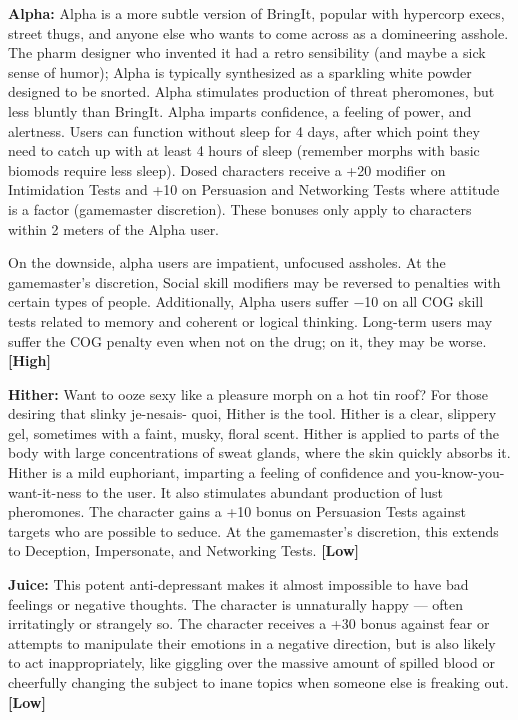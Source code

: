 \textbf{Alpha:} Alpha is a more subtle version of BringIt, popular with hypercorp execs, street thugs, and anyone else who wants to come across as a domineering asshole. The pharm designer who invented it had a retro sensibility (and maybe a sick sense of humor); Alpha is typically synthesized as a sparkling white powder designed to be snorted. Alpha stimulates production of threat pheromones, but less bluntly than BringIt. Alpha imparts confidence, a feeling of power, and alertness. Users can function without sleep for 4 days, after which point they need to catch up with at least 4 hours of sleep (remember morphs with basic biomods require less sleep). Dosed characters receive a +20 modifier on Intimidation Tests and +10 on Persuasion and Networking Tests where attitude is a factor (gamemaster discretion). These bonuses only apply to characters within 2 meters of the Alpha user. 

On the downside, alpha users are impatient, unfocused assholes. At the gamemaster’s discretion, Social skill modifiers may be reversed to penalties with certain types of people. Additionally, Alpha users suffer $-$10 on all COG skill tests related to memory and coherent or logical thinking. Long-term users may suffer the COG penalty even when not on the drug; on it, they may be worse. \textbf{[High]} 

\textbf{Hither:} Want to ooze sexy like a pleasure morph on a hot tin roof? For those desiring that slinky je-nesais- quoi, Hither is the tool. Hither is a clear, slippery gel, sometimes with a faint, musky, floral scent. Hither is applied to parts of the body with large concentrations of sweat glands, where the skin quickly absorbs it. Hither is a mild euphoriant, imparting a feeling of confidence and you-know-you-want-it-ness to the user. It also stimulates abundant production of lust pheromones. The character gains a +10 bonus on Persuasion Tests against targets who are possible to seduce. At the gamemaster’s discretion, this extends to Deception, Impersonate, and Networking Tests. \textbf{[Low]} 

\textbf{Juice:} This potent anti-depressant makes it almost impossible to have bad feelings or negative thoughts. The character is unnaturally happy --- often irritatingly or strangely so. The character receives a +30 bonus against fear or attempts to manipulate their emotions in a negative direction, but is also likely to act inappropriately, like giggling over the massive amount of spilled blood or cheerfully changing the subject to inane topics when someone else is freaking out. \textbf{[Low]} 



